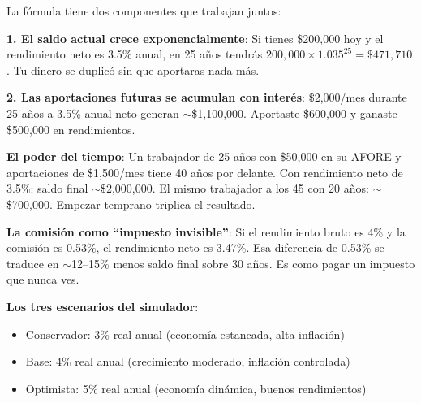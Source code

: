 \documentclass[11pt,a4paper]{report}
\begin{document}
\begin{tcolorbox}[colback=green!5!white, colframe=green!50!black, title=\textbf{Intuici\'on}]
La f\'ormula tiene dos componentes que trabajan juntos:

\textbf{1. El saldo actual crece exponencialmente}: Si tienes \$200,000 hoy y el rendimiento neto es 3.5\% anual, en 25 a\~nos tendr\'as $200{,}000 \times 1.035^{25} = \$471,710$. Tu dinero se duplic\'o sin que aportaras nada m\'as.

\textbf{2. Las aportaciones futuras se acumulan con inter\'es}: \$2,000/mes durante 25 a\~nos a 3.5\% anual neto generan $\sim$\$1,100,000. Aportaste \$600,000 y ganaste \$500,000 en rendimientos.

\textbf{El poder del tiempo}: Un trabajador de 25 a\~nos con \$50,000 en su AFORE y aportaciones de \$1,500/mes tiene 40 a\~nos por delante. Con rendimiento neto de 3.5\%: saldo final $\sim$\$2,000,000. El mismo trabajador a los 45 con 20 a\~nos: $\sim$\$700,000. Empezar temprano triplica el resultado.

\textbf{La comisi\'on como ``impuesto invisible''}: Si el rendimiento bruto es 4\% y la comisi\'on es 0.53\%, el rendimiento neto es 3.47\%. Esa diferencia de 0.53\% se traduce en $\sim$12--15\% menos saldo final sobre 30 a\~nos. Es como pagar un impuesto que nunca ves.

\textbf{Los tres escenarios del simulador}:
\begin{itemize}[nosep]
\item Conservador: 3\% real anual (econom\'ia estancada, alta inflaci\'on)
\item Base: 4\% real anual (crecimiento moderado, inflaci\'on controlada)
\item Optimista: 5\% real anual (econom\'ia din\'amica, buenos rendimientos)
\end{itemize}
\end{tcolorbox}
\end{document}
